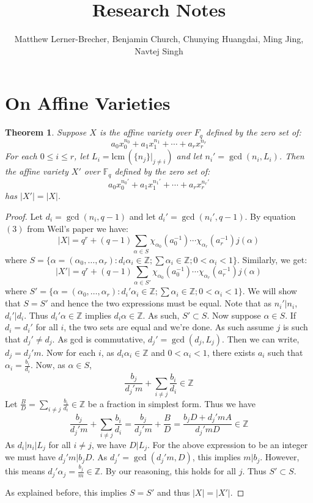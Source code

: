 \documentclass{article}
\newcommand{\Z}{\mathbb{Z}}
\newcommand{\F}{\mathbb{F}}
\newcommand{\lcm}[0]{\mathrm{lcm} \,}
\newtheorem{theorem}{Theorem}[section]
\theoremstyle{definition}
\theoremstyle{definition}
\theoremstyle{remark}
\begin{document}
\title{\Huge \textbf{Research Notes}}
\author{Matthew Lerner-Brecher, Benjamin Church, Chunying Huangdai, Ming Jing, Navtej Singh}
\maketitle
\tableofcontents
\newpage

\section{On Affine Varieties}

\begin{theorem}
\label{thm:affine_reduct}
Suppose $X$ is the affine variety over $F_{q}$ defined by the zero set of:
\[a_0x_0^{n_0} + a_1x_1^{n_1} + \cdots + a_r x_r^{n_r}\]
For each $0 \le i \le r$, let $L_i = \lcm(\{n_j\}|_{j\neq i})$ and let $n_i' = \gcd(n_i, L_i)$. Then the affine variety $X'$ over $\F_q$ defined by the zero set of:
\[a_0x_0^{n_0'} + a_1x_1^{n_1'} + \cdots + a_r x_r^{n_r'}\]
has $|X'| = |X|$.
\end{theorem}
\begin{proof}
Let $d_i = \gcd(n_i, q - 1)$ and let $d_i' = \gcd(n_i', q - 1)$. By equation $(3)$ from Weil's paper we have:
\[|X| = q^r + (q-1)\sum_{\alpha \in S}\chi_{\alpha_0}(a_0^{-1})\cdots\chi_{\alpha_r}(a_r^{-1}) j(\alpha)\]
where $S = \{\alpha = (\alpha_0, \ldots, \alpha_r) : d_i\alpha_i \in \Z; \sum \alpha_i \in \Z; 0 < \alpha_i < 1 \}$. Similarly, we get:
\[|X'| = q^r + (q-1)\sum_{\alpha \in S'} \chi_{\alpha_0}(a_0^{-1})\cdots\chi_{\alpha_r}(a_r^{-1})j(\alpha)\]
where  $S' = \{\alpha = (\alpha_0, \ldots, \alpha_r) : d_i'\alpha_i \in \Z; \sum \alpha_i \in \Z; 0 < \alpha_i < 1 \}$. We will show that $S = S'$ and hence the two expressions must be equal. Note that as $n_i' | n_i$, $d_i' | d_i$. Thus $d_i'\alpha \in \Z$ implies $d_i\alpha \in \Z$. As such, $S' \subset S$. Now suppose $\alpha \in S$. If $d_i = d_i'$ for all $i$, the two sets are equal and we're done. As such assume $j$ is such that $d_j' \neq d_j$. As gcd is commutative, $d_j' = \gcd(d_j, L_j)$. Then we can write, $d_j = d_j'm$. Now for each $i$, as $d_i\alpha_i \in \Z$ and $0 < \alpha_i < 1$, there exists $a_i$ such that $\alpha_i = \frac{b_i}{d_i}$. Now, as $\alpha \in S$,
\[\frac{b_j}{d_j'm} + \sum_{i \neq j}\frac{b_i}{d_i} \in \Z\]
Let $\frac{B}{D} = \sum_{i \neq j}\frac{b_i}{d_i} \in \Z $ be a fraction in simplest form. Thus we have
\[\frac{b_j}{d_j'm} + \sum_{i \neq j}\frac{b_i}{d_i} = \frac{b_j}{d_j'm} + \frac{B}{D} = \frac{b_jD + d_j'mA}{d_j'mD} \in \Z\]
As $d_i | n_i | L_j$ for all $i \neq j$, we have $D | L_j$. For the above expression to be an integer we must have $d_j'm | b_jD$. As $d_j' = \gcd(d_j'm, D)$, this implies $m | b_j$. However, this means $d_j'\alpha_j = \frac{b_j}{m} \in \Z$. By our reasoning, this holds for all $j$. Thus $S' \subset S$.
\par
As explained before, this implies $S = S'$ and thus $|X| = |X'|$.
\end{proof}
\end{document}
